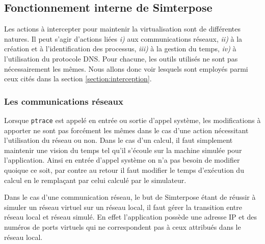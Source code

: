 \subsection{Fonctionnement interne de Simterpose}
\label{subsection:fonctionnement_simterpose}

Les actions à intercepter pour maintenir la virtualisation sont de différentes
natures. Il peut s'agir d'actions liées \textit{i)} aux communications réseaux,
\textit{ii)} à la création et à l'identification des processus, \textit{iii)} à
la gestion du temps, \textit{iv)} à l'utilisation du protocole DNS. Pour chacune, les outils utilisés ne sont pas nécessairement les mêmes. Nous allons donc voir
lesquels sont employés parmi ceux cités dans la section
\ref{section:interception}.

\subsubsection{Les communications réseaux}
\label{subsubsection:fonctionnement_reseau}

Lorsque \texttt{ptrace} est appelé en entrée ou sortie d'appel système, les
modifications à apporter ne sont pas forcément les mêmes dans le cas d'une
action nécessitant l'utilisation du réseau ou non. Dans le cas d'un calcul, il
faut simplement maintenir une vision du temps tel qu'il s'écoule sur la machine
simulée pour l'application. Ainsi en entrée d'appel système on n'a pas besoin de
modifier quoique ce soit, par contre au retour il faut modifier le temps
d'exécution du calcul en le remplaçant par celui calculé par le simulateur.

Dans le cas d'une communication réseau, le but de Simterpose étant de réussir à
simuler un réseau virtuel sur un réseau local, il faut gérer la
transition entre réseau local et réseau simulé. En effet l'application possède
une adresse IP et des numéros de ports virtuels qui ne correspondent pas à ceux attribués dans le réseau local.

